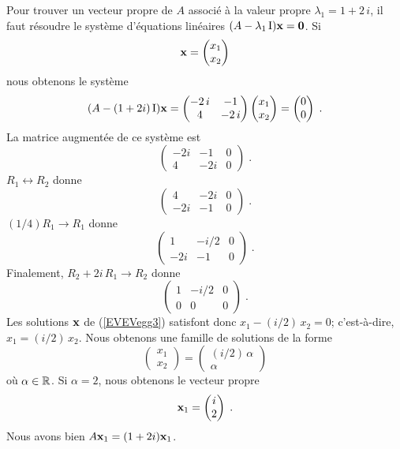 {\begin{egg}
Pour trouver un vecteur propre de $A$ associé à la valeur propre
$\lambda_1=1+2\,i$, il faut résoudre le système d'équations linéaires
$(A-\lambda_1 \operatorname{I}) \mathbf{x} = \mathbf{0}$.  Si
\[
\mathbf{x} =
\begin{pmatrix}
x_1 \\ x_2
\end{pmatrix}
\]
nous obtenons le système
\begin{equation}\label{EVEVegg3}
(A - (1 + 2 i)\operatorname{I})\mathbf{x} =
\begin{pmatrix}
-2\,i & -1 \\ 4 & -2\,i  
\end{pmatrix}
\begin{pmatrix}
x_1 \\ x_2
\end{pmatrix}
=
\begin{pmatrix}
0 \\ 0
\end{pmatrix} \; .
\end{equation}
La matrice augmentée de ce système est
\[
\left(\begin{array}{rr|r}
-2i & -1 & 0 \\
4 & -2i & 0
\end{array}\right) \; .
\]
$R_1 \leftrightarrow R_2$ donne
\[
\left(\begin{array}{rr|r}
4 & -2i & 0 \\
-2i & -1 & 0
\end{array}\right) \; .
\]
$(1/4) R_1 \to R_1$ donne
\[
\left(\begin{array}{rr|r}
1 & -i/2 & 0 \\
-2i & -1 & 0
\end{array}\right) \; .
\]
Finalement, $R_2 + 2i\, R_1 \to R_2$ donne
\[
\left(\begin{array}{rr|r}
1 & -i/2 & 0 \\
0 & 0 & 0
\end{array}\right) \; .
\]
Les solutions $\mathbf{x}$ de (\ref{EVEVegg3}) satisfont donc
$x_1 -(i/2)\, x_2 = 0$; c'est-à-dire, $x_1=(i/2)\,x_2$.  Nous obtenons
une famille de solutions de la forme
\[
\begin{pmatrix}
x_1 \\ x_2
\end{pmatrix}
=
\begin{pmatrix}
(i/2)\,\alpha \\ \alpha
\end{pmatrix}
\]
où $\alpha \in \mathbb{R}$.  Si $\alpha = 2$, nous obtenons le vecteur propre
\[
\mathbf{x}_1 =
\begin{pmatrix}
i \\ 2
\end{pmatrix} \; .
\]
Nous avons bien $A\mathbf{x}_1 = (1 + 2i) \mathbf{x}_1$.


\end{egg}}

